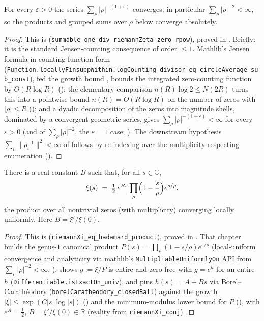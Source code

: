 \begin{lemma}
\label{lem:lb_pf_summable}
\leanok
{}
For every $\varepsilon>0$ the series $\sum_\rho |\rho|^{-(1+\varepsilon)}$
converges; in particular $\sum_\rho|\rho|^{-2}<\infty$, so the products and grouped
sums over $\rho$ below converge absolutely.
\end{lemma}

\begin{proof}
\leanok
{}
This is 
(\texttt{summable\_one\_div\_riemannZeta\_zero\_rpow}), proved in
. Briefly: it is
the standard Jensen-counting consequence of order $\le1$. Mathlib's Jensen formula in
counting-function form
(\texttt{Function.locallyFinsuppWithin.logCounting\_divisor\_eq\_circleAverage\_sub\_const}),
fed the growth bound , bounds the integrated zero-counting
function by $O(R\log R)$ (); the elementary comparison
$n(R)\log2\le N(2R)$ turns this into a pointwise bound $n(R)=O(R\log R)$ on the number
of zeros with $|\rho|\le R$ (); and a dyadic decomposition
of the zeros into magnitude shells, dominated by a convergent geometric series, gives
$\sum_\rho|\rho|^{-(1+\varepsilon)}<\infty$ for every $\varepsilon>0$ (and of
$\sum_\rho|\rho|^{-2}$, the $\varepsilon=1$ case; ). The
downstream hypothesis $\sum_i\|\rho_i^{-1}\|^2<\infty$ of 
follows by re-indexing over the multiplicity-respecting enumeration
().
\end{proof}

\begin{lemma}
\label{lem:lb_pf_hadamard}
\leanok
{}
There is a real constant $B$ such that, for all $s\in\mathbb C$,
\[
  \xi(s)\;=\;\tfrac12\,e^{Bs}\prod_\rho\Bigl(1-\frac s\rho\Bigr)e^{s/\rho},
\]
the product over all nontrivial zeros (with multiplicity) converging locally
uniformly. Here $B=\xi'/\xi(0)$.
\end{lemma}

\begin{proof}
\leanok
{}
This is  (\texttt{riemannXi\_eq\_hadamard\_product}),
proved in . That chapter builds the genus-$1$ canonical product
$P(s)=\prod_\rho(1-s/\rho)e^{s/\rho}$
(local-uniform convergence and analyticity via mathlib's
\texttt{MultipliableUniformlyOn} API from $\sum_\rho|\rho|^{-2}<\infty$,
), shows $g:=\xi/P$ is entire and zero-free with
$g=e^{h}$ for an entire $h$ (\texttt{Differentiable.isExactOn\_univ}), and pins
$h(s)=A+Bs$ via Borel--Carathéodory (\texttt{borelCaratheodory\_closedBall}) against
the growth $|\xi|\le\exp(C|s|\log|s|)$ () and the
minimum-modulus lower bound for $P$ (), with $e^{A}=\tfrac12$,
$B=\xi'/\xi(0)\in\mathbb R$ (reality from \texttt{riemannXi\_conj}).
\end{proof}

